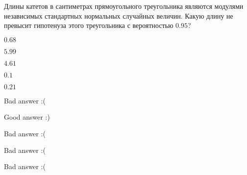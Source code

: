 
\begin{question}
Длины катетов в сантиметрах прямоугольного треугольника являются
модулями независимых стандартных нормальных случайных величин. Какую
длину не превысит гипотенуза этого треугольника с вероятностью \(0.95\)?
\begin{answerlist}
  \item \(0.68\)
  \item \(5.99\)
  \item \(4.61\)
  \item \(0.1\)
  \item \(0.21\)
\end{answerlist}
\end{question}

\begin{solution}
\begin{answerlist}
  \item Bad answer :(
  \item Good answer :)
  \item Bad answer :(
  \item Bad answer :(
  \item Bad answer :(
\end{answerlist}
\end{solution}

